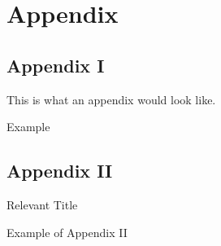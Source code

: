 
\section{Appendix}
\subsection{Appendix I} \label{app1}
\begin{frame}
    \begin{remark}
    This is what an appendix would look like.
    \end{remark}
    \begin{exampleblock}{Example}
    {\gray \lipsum[2][1-20]}
    \end{exampleblock}
\end{frame}

\subsection{Appendix II} \label{app2}
\begin{frame}
    \begin{block}{Relevant Title}
    {\gray \lipsum[2][1]}
    \end{block}
    \begin{exampleblock}{Example of Appendix II}
    {\gray \lipsum[4][1-20]}
    \end{exampleblock}
\end{frame}